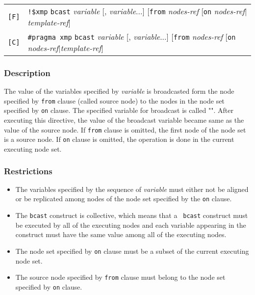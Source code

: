 \begin{tabular}{ll}
\verb![F]! & \verb|!$xmp| {\tt bcast} {\it variable} 
[, {\it variable}...] [{\tt from} {\it nodes-ref} [{\tt on} {\it
  nodes-ref}$\vert${\it template-ref}] \\
\verb![C]! & \verb|#pragma xmp| {\tt bcast} {\it variable} 
[, {\it variable}...] [{\tt from} {\it nodes-ref} [{\tt on} {\it
  nodes-ref}$\vert${\it template-ref}] \\
\end{tabular}

\subsubsection*{Description}

The value of the variables specified by {\it variable} is broadcasted
form the node specified by {\tt from} clause (called source node) to
the nodes in the node set specified by {\tt on} clause. The specified
variable for broadcast is called "". After
executing this directive, the value of the broadcast variable became
same as the value of the source node. If {\tt from} clause is omitted,
the first node of the node set is a source node. If {\tt on} clause is
omitted, the operation is done in the current executing node set.

\subsubsection*{Restrictions}

\begin{itemize}
\item The variables specified by the sequence of {\it variable} must
      either not be aligned or be replicated among nodes of the node set
      specified by the {\tt on} clause.
\item The {\tt bcast} construct is collective, which means that a {\tt
      bcast} construct must be executed by all of the executing nodes
      and each variable appearing in the construct must have the same
      value among all of the executing nodes.
\item The node set specified by {\tt on} clause must be a subset of the
      current executing node set.
\item The source node specified by {\tt from} clause must belong to
  the node set specified by {\tt on} clause. 
\end{itemize}

